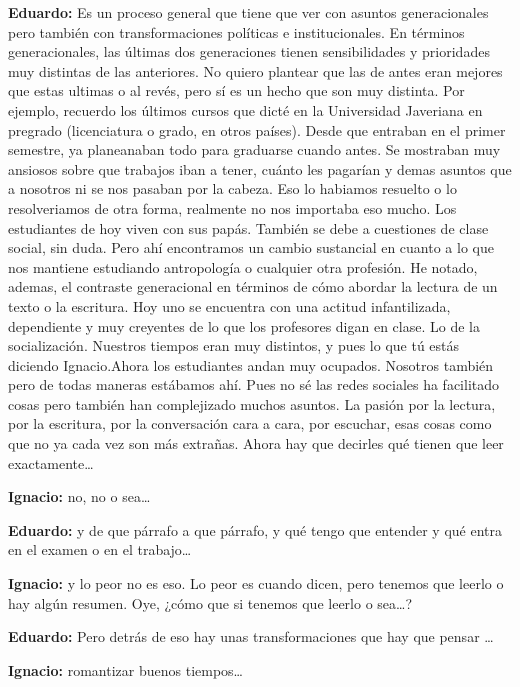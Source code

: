 \documentclass[
]{interact}
\begin{document}
\textbf{Eduardo:} Es un proceso general que tiene que ver con asuntos
generacionales pero también con transformaciones políticas e
institucionales. En términos generacionales, las últimas dos
generaciones tienen sensibilidades y prioridades muy distintas de las
anteriores. No quiero plantear que las de antes eran mejores que estas
ultimas o al revés, pero sí es un hecho que son muy distinta. Por
ejemplo, recuerdo los últimos cursos que dicté en la Universidad
Javeriana en pregrado (licenciatura o grado, en otros países). Desde que
entraban en el primer semestre, ya planeanaban todo para graduarse
cuando antes. Se mostraban muy ansiosos sobre que trabajos iban a tener,
cuánto les pagarían y demas asuntos que a nosotros ni se nos pasaban por
la cabeza. Eso lo habiamos resuelto o lo resolveriamos de otra forma,
realmente no nos importaba eso mucho. Los estudiantes de hoy viven con
sus papás. También se debe a cuestiones de clase social, sin duda. Pero
ahí encontramos un cambio sustancial en cuanto a lo que nos mantiene
estudiando antropología o cualquier otra profesión. He notado, ademas,
el contraste generacional en términos de cómo abordar la lectura de un
texto o la escritura. Hoy uno se encuentra con una actitud
infantilizada, dependiente y muy creyentes de lo que los profesores
digan en clase. Lo de la socialización. Nuestros tiempos eran muy
distintos, y pues lo que tú estás diciendo Ignacio.Ahora los estudiantes
andan muy ocupados. Nosotros también pero de todas maneras estábamos
ahí. Pues no sé las redes sociales ha facilitado cosas pero también han
complejizado muchos asuntos. La pasión por la lectura, por la escritura,
por la conversación cara a cara, por escuchar, esas cosas como que no ya
cada vez son más extrañas. Ahora hay que decirles qué tienen que leer
exactamente\ldots{}

\textbf{Ignacio:} no, no o sea\ldots{}

\textbf{Eduardo:} y de que párrafo a que párrafo, y qué tengo que
entender y qué entra en el examen o en el trabajo\ldots{}

\textbf{Ignacio:} y lo peor no es eso. Lo peor es cuando dicen, pero
tenemos que leerlo o hay algún resumen. Oye, ¿cómo que si tenemos que
leerlo o sea\ldots?

\textbf{Eduardo:} Pero detrás de eso hay unas transformaciones que hay
que pensar \ldots{}

\textbf{Ignacio:} romantizar buenos tiempos\ldots{}
\end{document}
